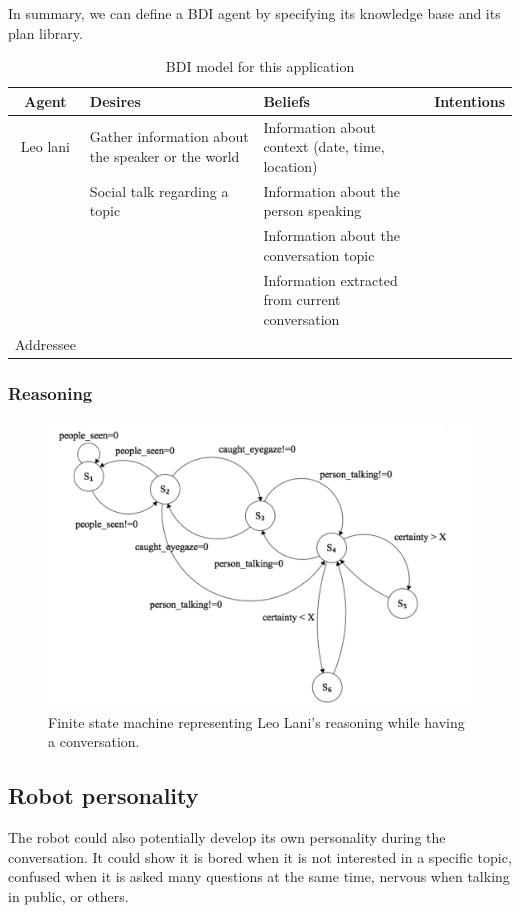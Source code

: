 \documentclass[a4paper]{article}
\begin{document}
In summary, we can define a BDI agent by specifying its knowledge base and its plan library. 

\begin{table}[h]
\centering
\begin{tabular}{||c|p{2.5cm}|p{2.5cm}|p{2.5cm}||}
\hline
\textbf{Agent} & \textbf{Desires} & \textbf{Beliefs} & \textbf{Intentions} \\
[0.5ex] 
\hline \hline
Leo lani & 
Gather information about the speaker or the world & 
Information about context (date, time, location) &  \\
& Social talk regarding a topic & Information about the person speaking &  \\
& & Information about the conversation topic &  \\
& & Information extracted from current conversation & \\
\hline
Addressee &  &  &  \\ [1ex]
\hline 
\end{tabular}
\caption{BDI model for this application}
\label{table:BDI}
\end{table}

\subsubsection{Reasoning}

\begin{figure}[H]
  \includegraphics[width=\linewidth]{images/FSM.png}
  \caption{Finite state machine representing Leo Lani's reasoning while having a conversation.}
  \label{fig:FSM}
\end{figure}

\subsection{Robot personality}
The robot could also potentially develop its own personality during the conversation. It could show it is bored when it is not interested in a specific topic, confused when it is asked many questions at the same time, nervous when talking in public, or others. 
\end{document}
